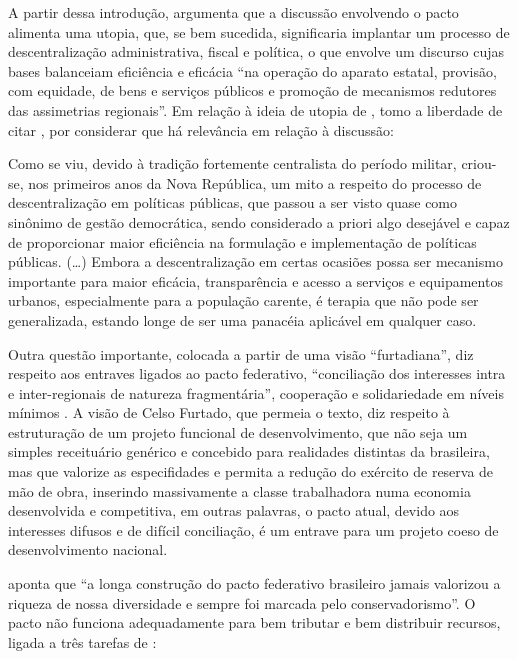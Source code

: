 \documentclass[
article,			%
11pt,				%
oneside,			%
a4paper,			%
english,			%
brazil,				%
sumario=tradicional
]{abntex2}
\begin{document}
	A partir dessa introdução,  argumenta que a discussão envolvendo o pacto alimenta uma utopia, que, se bem sucedida, significaria implantar um processo de descentralização administrativa, fiscal e política, o que envolve um discurso cujas bases balanceiam eficiência e eficácia ``na operação do aparato estatal, provisão, com equidade, de bens e serviços públicos e promoção de mecanismos redutores das assimetrias regionais''. Em relação à ideia de utopia de , tomo a liberdade de citar \cite[p. 104]{guia2015a}, por considerar que há relevância em relação à discussão:
	
	\begin{citacao}
		Como se viu, devido à tradição fortemente centralista do período militar, criou-se, nos primeiros anos da Nova República, um mito a respeito do processo de descentralização em políticas públicas, que passou a ser visto quase como sinônimo de gestão democrática, sendo considerado a priori algo desejável e capaz de proporcionar maior eficiência na formulação e implementação de políticas públicas. (\dots) Embora a descentralização em certas ocasiões possa ser mecanismo importante para maior eficácia, transparência e acesso a serviços e equipamentos urbanos, especialmente para a população carente, é terapia que não pode ser generalizada, estando longe de ser uma panacéia aplicável em qualquer caso.
	\end{citacao}
	
	Outra questão importante, colocada a partir de uma visão ``furtadiana'', diz respeito aos entraves ligados ao pacto federativo, ``conciliação dos interesses intra e inter-regionais de natureza fragmentária'', cooperação e solidariedade em níveis mínimos \cite[p. 118]{brandao2011a}. A visão de Celso Furtado, que permeia o texto, diz respeito à estruturação de um projeto funcional de desenvolvimento, que não seja um simples receituário genérico e concebido para realidades distintas da brasileira, mas que valorize as especifidades e permita a redução do exército de reserva de mão de obra, inserindo massivamente a classe trabalhadora numa economia desenvolvida e competitiva, em outras palavras, o pacto atual, devido aos interesses difusos e de difícil conciliação, é um entrave para um projeto coeso de desenvolvimento nacional.
	
	 aponta que ``a longa construção do pacto federativo brasileiro jamais valorizou a riqueza de nossa diversidade e sempre foi marcada pelo conservadorismo''. O pacto não funciona adequadamente para bem tributar e bem distribuir recursos, ligada a três tarefas de \cite[p. 119]{brandao2011a}:
	
\end{document}
